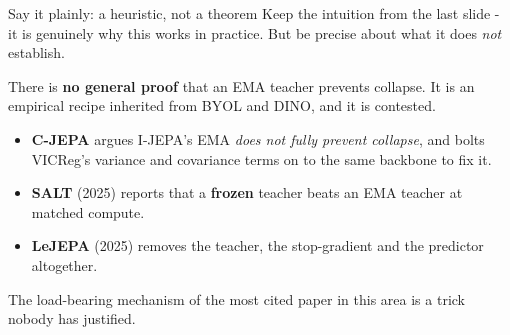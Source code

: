 \documentclass[aspectratio=169]{beamer}
\begin{document}
\begin{frame}{Say it plainly: a heuristic, not a theorem}
  \small
  Keep the intuition from the last slide - it is genuinely why this works in practice. But
  be precise about what it does \emph{not} establish.
  \vskip 6pt
  \begin{center}
  \end{center}
  \vskip 8pt
  There is \textbf{no general proof} that an EMA teacher prevents collapse. It is an
  empirical recipe inherited from BYOL and DINO, and it is contested.
  \vskip 8pt
  \begin{itemize}\small
    \item \textbf{C-JEPA} argues I-JEPA's EMA \emph{does not fully prevent collapse}, and
      bolts VICReg's variance and covariance terms on to the same backbone to fix it.
    \item \textbf{SALT} (2025) reports that a \textbf{frozen} teacher beats an EMA teacher
      at matched compute.
    \item \textbf{LeJEPA} (2025) removes the teacher, the stop-gradient and the predictor
      altogether.
  \end{itemize}
  \vskip 10pt
  \begin{center}
    \small\color{armred}The load-bearing mechanism of the most cited paper in this area is
    a trick nobody has justified.
  \end{center}
\end{frame}
\end{document}
